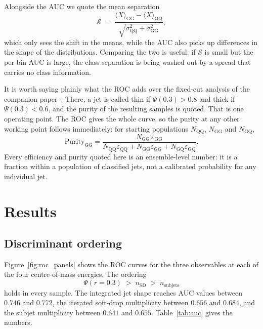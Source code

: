 \documentclass[reprint,amsmath,amssymb,aps,prd,floatfix]{revtex4-2}
\begin{document}
Alongside the AUC we quote the mean separation
\begin{equation}
\mathcal{S} \;=\;
\frac{\langle X\rangle_{\mathrm{GG}} - \langle X\rangle_{\mathrm{QQ}}}
     {\sqrt{\sigma^2_{\mathrm{QQ}} + \sigma^2_{\mathrm{GG}}}},
\label{eq:sep}
\end{equation}
which only sees the shift in the means, while the AUC also picks up differences
in the shape of the distributions. Comparing the two is useful: if
$\mathcal{S}$ is small but the per-bin AUC is large, the class separation is
being washed out by a spread that carries no class information.

It is worth saying plainly what the ROC adds over the fixed-cut analysis of the
companion paper~\cite{Singh:2026photo}. There, a jet is called thin if
$\Psi(0.3) > 0.8$ and thick if
$\Psi(0.3) < 0.6$, and the purity of the resulting samples is quoted. That is
one operating point. The ROC gives the whole curve, so the purity at any other
working point follows immediately: for starting populations $N_{\mathrm{QQ}}$,
$N_{\mathrm{GG}}$ and $N_{\mathrm{GQ}}$,
\begin{equation}
\mathrm{Purity}_{\mathrm{GG}} =
\frac{N_{\mathrm{GG}}\,\varepsilon_{\mathrm{GG}}}
     {N_{\mathrm{QQ}}\bar{\varepsilon}_{\mathrm{QQ}}
    + N_{\mathrm{GG}}\varepsilon_{\mathrm{GG}}
    + N_{\mathrm{GQ}}\varepsilon_{\mathrm{GQ}}}.
\end{equation}
Every efficiency and purity quoted here is an ensemble-level number: it is a
fraction within a population of classified jets, not a calibrated probability
for any individual jet.

\section{Results}\label{sec:results}

\subsection{Discriminant ordering}

Figure~\ref{fig:roc_panels} shows the ROC curves for the three observables at each
of the four centre-of-mass energies. The ordering
\begin{equation}
\Psi(r=0.3) \;>\; n_{\mathrm{SD}} \;>\; n_{\mathrm{subjets}}
\end{equation}
holds in every sample. The integrated jet shape reaches AUC values between
$0.746$ and $0.772$, the iterated soft-drop multiplicity between $0.656$ and
$0.684$, and the subjet multiplicity between $0.641$ and $0.655$.
Table~\ref{tab:auc} gives the numbers.
\end{document}
